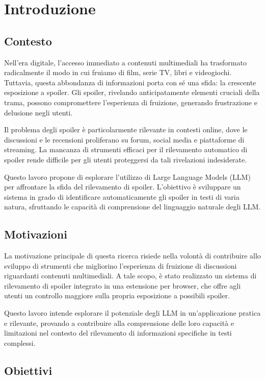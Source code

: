 \chapter{Introduzione}
\label{ch:introduzione}

\section{Contesto}
\label{sec:contesto}
Nell'era digitale, l'accesso immediato a contenuti
multimediali ha trasformato radicalmente il modo in cui
fruiamo di film, serie TV, libri e videogiochi.
Tuttavia, questa abbondanza di informazioni porta con sé
una sfida: la crescente esposizione a spoiler.
Gli spoiler, rivelando anticipatamente elementi cruciali
della trama, possono compromettere l'esperienza di
fruizione, generando frustrazione e delusione negli utenti.

Il problema degli spoiler è particolarmente rilevante in
contesti online, dove le discussioni e le recensioni
proliferano su forum, social media e piattaforme di
streaming.
La mancanza di strumenti efficaci per il rilevamento
automatico di spoiler rende difficile per gli utenti
proteggersi da tali rivelazioni indesiderate.

Questo lavoro propone di esplorare l'utilizzo di Large
Language Models (LLM) per affrontare la sfida del
rilevamento di spoiler.
L'obiettivo è sviluppare un sistema in grado di
identificare automaticamente gli spoiler in testi di varia
natura, sfruttando le capacità di comprensione del
linguaggio naturale degli LLM.

\section{Motivazioni}
\label{sec:motivazioni}
La motivazione principale di questa ricerca risiede nella
volontà di contribuire allo sviluppo di strumenti che
migliorino l'esperienza di fruizione di discussioni
riguardanti contenuti multimediali.
A tale scopo, è stato realizzato un sistema di rilevamento
di spoiler integrato in una estensione per browser, che
offre agli utenti un controllo maggiore sulla propria
esposizione a possibili spoiler.

Questo lavoro intende esplorare il potenziale degli LLM in
un'applicazione pratica e rilevante, provando a contribuire
alla comprensione delle loro capacità e limitazioni nel
contesto del rilevamento di informazioni specifiche in
testi complessi.

\section{Obiettivi}
\label{sec:obiettivi}

